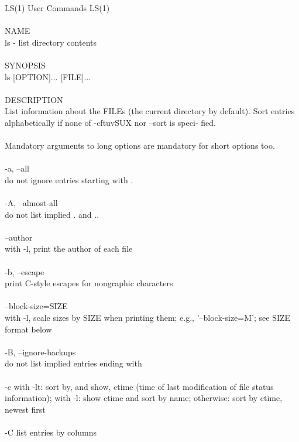 \documentclass{article}
\begin{document}
LS(1)                            User Commands                           LS(1) \\
\\
NAME \\
       ls - list directory contents \\
\\
SYNOPSIS \\
       ls [OPTION]... [FILE]... \\
\\
DESCRIPTION \\
       List  information  about  the FILEs (the current directory by default).
       Sort entries alphabetically if none of -cftuvSUX nor --sort  is  speci‐
       fied. \\
\\
       Mandatory  arguments  to  long  options are mandatory for short options
       too. \\
\\
       -a, --all\\
              do not ignore entries starting with .\\
\\
       -A, --almost-all\\
              do not list implied . and .. \\
\\
       --author \\
              with -l, print the author of each file \\
\\
       -b, --escape \\
              print C-style escapes for nongraphic characters \\
\\
       --block-size=SIZE \\
              with  -l,  scale  sizes  by  SIZE  when  printing  them;   e.g.,
              '--block-size=M'; see SIZE format below \\
\\
       -B, --ignore-backups \\
              do not list implied entries ending with ~ \\
\\
       -c     with -lt: sort by, and show, ctime (time of last modification of
              file status information); with -l: show ctime and sort by  name;
              otherwise: sort by ctime, newest first \\
\\
       -C     list entries by columns \\
\end{document}
